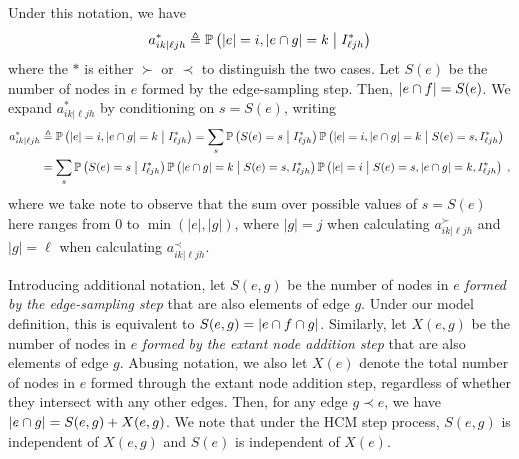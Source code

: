 Under this notation, we have
\begin{equation}
    a^*_{ik|\ell j h} \eqdef \prob{\abs{e} = i, \abs{e \cap g} = k \given I^*_{\ell j h}}
\end{equation}
where the $*$ is either $\succ$ or $\prec$ to distinguish the two cases.
Let $S(e)$ be the number of nodes in $e$ formed by the edge-sampling step.
Then, $\left\lvert e \cap f \right\rvert = S(e)$. 
We expand $a^*_{ik|\ell j h}$ by conditioning on $s = S(e)$, writing 
\begin{align}
    a^*_{ik|\ell j h} &\eqdef \prob{\abs{e} = i, \abs{e\cap g} = k \given I^*_{\ell j h}} 
    = \sum_{s} \prob{S(e) = s \given I^*_{\ell j h}} \prob{\abs{e} = i, \abs{e\cap g} = k \given S(e) = s , I^*_{\ell j h}}  \nonumber\\ 
    &= \sum_{s} \prob{S(e) = s \given I^*_{\ell j h}} \prob{\abs{e\cap g} = k \given S(e) = s , I^*_{\ell j h}} \prob{\abs{e} = i \given  S(e) = s ,  \abs{e\cap g} = k , I^*_{\ell j h}}  \;, \label{eq:a-star-1}
\end{align}
where we take note to observe that the sum over possible values of $s=S(e)$ here ranges from $0$ to $\min(|e|,|g|)$, where $|g|=j$ when calculating $a^\succ_{ik|\ell j h}$ and $|g|=\ell$ when calculating $a^\prec_{ik|\ell j h}$.

Introducing additional notation,  
let $S(e,g)$ be the number of nodes in $e$ \emph{formed by the edge-sampling step} that are also elements of edge $g$. 
Under our model definition, this is equivalent to  $S(e,g)= \left\lvert e \cap f \cap g \right\rvert$. 
Similarly, let $X(e, g)$ be the number of nodes in $e$ \emph{formed by the extant node addition step} that are also elements of edge $g$.
Abusing notation, we also let $X(e)$ denote the total number of nodes in $e$ formed through the extant node addition step, regardless of whether they intersect with any other edges. 
Then, for any edge $g \prec e$, we have $\left\lvert e \cap g \right\rvert = S(e,g) + X(e,g)$.
We note that under the HCM step process, $S(e,g)$ is independent of $X(e,g)$ and $S(e)$ is independent of $X(e)$.



